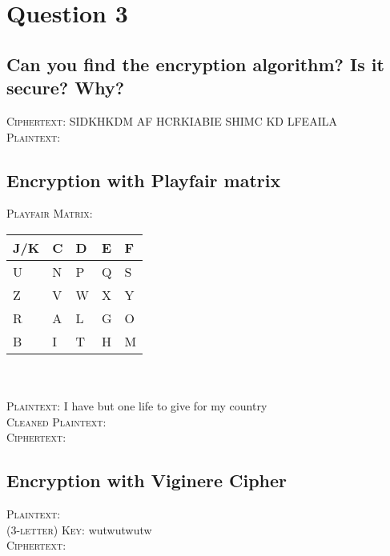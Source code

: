 \documentclass{report}
\begin{document}
	\section{Question 3}
	\startsection
		\renewcommand{\thesubsection}{\thesection.\Alph{subsection}}
		\subsection{Can you find the encryption algorithm? Is it secure? Why?}
		\startsubsection
			\textsc{Ciphertext}: SIDKHKDM AF HCRKIABIE SHIMC KD LFEAILA \\
			\textsc{Plaintext}: 
		\closesection
		\subsection{Encryption with Playfair matrix}
		\startsubsection
			\textsc{Playfair Matrix}:
			\begin{tabular}{|M{0.3cm}|M{0.3cm}|M{0.3cm}|M{0.3cm}|M{0.3cm}|}
				\hline
				\hspace*{-0.4em} J/K & C & D & E & F \\
				\hline
				U & N & P & Q & S \\
				\hline
				Z & V & W & X & Y \\
				\hline
				R & A & L & G & O \\
				\hline
				B & I & T & H & M \\
				\hline
			\end{tabular}
			\hfill \\ \\
			\textsc{Plaintext}:  I have but one life to give for my country \\
			\textsc{Cleaned Plaintext}:  \\
			\textsc{Ciphertext}: 
		\closesection
		\subsection{Encryption with Viginere Cipher}
		\startsubsection
			\textsc{Plaintext}:  \\
			\textsc{(3-letter) Key}: wutwutwutw \\
			\textsc{Ciphertext}: 
		\closesection
	\closesection
\end{document}
